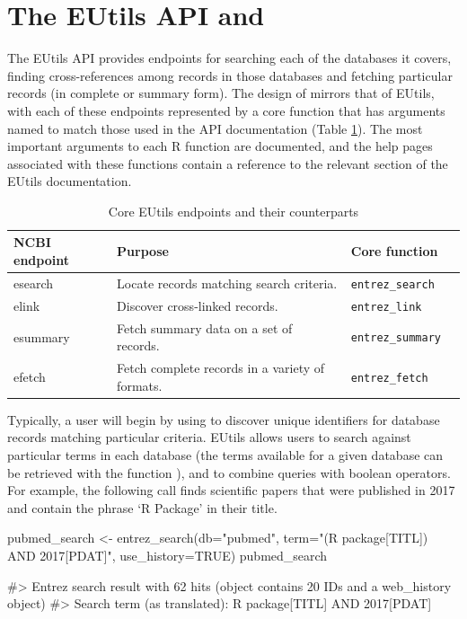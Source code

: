 \section{The EUtils API and  }

The EUtils API provides endpoints for searching each of the databases it covers, 
finding cross-references among records in those databases and fetching 
particular records (in complete or summary form). The design of  
mirrors that of EUtils, with each of these endpoints represented by a core
function that has arguments named to match those used in the API documentation
(Table \ref{tab:core-ends}). The most important arguments to each R function are
documented, and the help pages associated with these functions contain a reference 
to the relevant section of the EUtils documentation.

\begin{table}[]
\centering
\caption{Core EUtils endpoints and their  counterparts}
\label{tab:core-ends}
\begin{tabular}{llll}
\hline
NCBI endpoint & Purpose                                         & Core function            \\ \hline
esearch       & Locate records matching search criteria.        & \texttt{entrez\_search}  \\
elink         & Discover cross-linked records.                  & \texttt{entrez\_link}    \\ 
esummary      & Fetch summary data on a set of records.         & \texttt{entrez\_summary} \\ 
efetch        & Fetch complete records in a variety of formats. & \texttt{entrez\_fetch}   \\ \hline
\end{tabular}
\end{table}


Typically, a user will begin by using  to discover unique
identifiers for database records matching particular criteria. EUtils allows
users to search against particular terms in each database (the terms available
for a given database can be retrieved with the function
), and to combine queries with boolean operators. 
For example, the following call finds scientific papers that were published in 2017 
and contain the phrase `R Package' in their title.

\begin{example}
pubmed_search <- entrez_search(db="pubmed", 
                               term="(R package[TITL]) AND 2017[PDAT]", 
                               use_history=TRUE)
pubmed_search

#> Entrez search result with 62 hits (object contains 20 IDs and a web_history object)
#>  Search term (as translated):  R package[TITL] AND 2017[PDAT]
\end{example}

